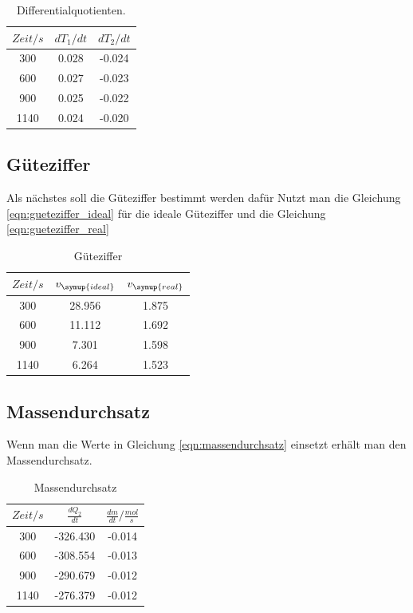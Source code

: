 \begin{table}
  \centering
  \begin{tabular}{c c c}
    \toprule
    $Zeit/s$ & $dT_1 /dt$ & $dT_2 /dt$ \\
    \midrule
    300  &  0.028 & -0.024  \\
    600  &  0.027 & -0.023  \\
    900  &  0.025 & -0.022  \\
   1140  &  0.024 & -0.020  \\
   \bottomrule
 \end{tabular}
 \caption{Differentialquotienten.}
 \label{tab:Diffquo}
\end{table}
\subsection{Güteziffer}
Als nächstes soll die Güteziffer bestimmt werden dafür Nutzt man die Gleichung
\eqref{eqn:gueteziffer_ideal} für die ideale Güteziffer und die Gleichung
\eqref{eqn:gueteziffer_real}
\begin{table}
  \centering

  \begin{tabular}{c c c}
    \toprule
    $Zeit/s$ & $v_\symup{ideal}$ &  $v_\symup{real}$ \\
    \midrule
      300  &  28.956  &  1.875 \\
      600  &  11.112  &  1.692 \\
      900  &  7.301  &  1.598 \\
     1140  &  6.264  &  1.523 \\
   \bottomrule
 \end{tabular}
 \caption{Güteziffer}
 \label{tab:Gütez}
\end{table}
\subsection{Massendurchsatz}
Wenn man die Werte in Gleichung \eqref{eqn:massendurchsatz} einsetzt erhält man
den Massendurchsatz.
\begin{table}
  \centering
\begin{tabular}{c c c}
  \toprule
  $Zeit /s$ & $\frac{dQ_2}{dt}$ & $\frac{dm}{dt} /\frac{mol}{s}$  \\
  \midrule
  300  &   -326.430  & -0.014  \\
  600  &   -308.554  & -0.013  \\
  900  &   -290.679  & -0.012  \\
 1140  &   -276.379  & -0.012  \\
 \bottomrule
\end{tabular}
\caption{Massendurchsatz}
\label{tab:Massend}
\end{table}
